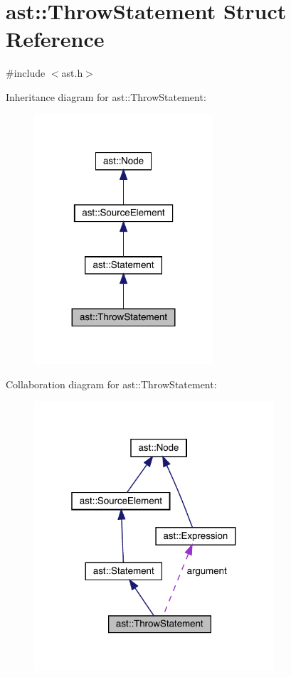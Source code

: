 \hypertarget{structast_1_1_throw_statement}{}\section{ast\+:\+:Throw\+Statement Struct Reference}
\label{structast_1_1_throw_statement}


{\ttfamily \#include $<$ast.\+h$>$}



Inheritance diagram for ast\+:\+:Throw\+Statement\+:
\nopagebreak
\begin{figure}[H]
\begin{center}
\leavevmode
\includegraphics[width=188pt]{structast_1_1_throw_statement__inherit__graph}
\end{center}
\end{figure}


Collaboration diagram for ast\+:\+:Throw\+Statement\+:
\nopagebreak
\begin{figure}[H]
\begin{center}
\leavevmode
\includegraphics[width=253pt]{structast_1_1_throw_statement__coll__graph}
\end{center}
\end{figure}
